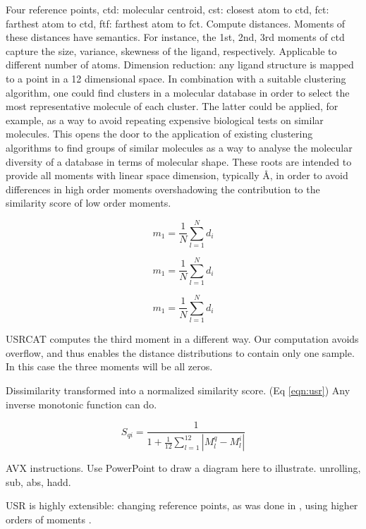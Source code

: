 \documentclass[twocolumn]{svjour3}          %
\begin{document}
Four reference points, ctd: molecular centroid, cst: closest atom to ctd, fct: farthest atom to ctd, ftf: farthest atom to fct. Compute distances. Moments of these distances have semantics. For instance, the 1st, 2nd, 3rd moments of ctd capture the size, variance, skewness of the ligand, respectively. Applicable to different number of atoms. Dimension reduction: any ligand structure is mapped to a point in a 12 dimensional space. In combination with a suitable clustering algorithm, one could find clusters in a molecular database in order to select the most representative molecule of each cluster. The latter could be applied, for example, as a way to avoid repeating expensive biological tests on similar molecules.  This opens the door to the application of existing clustering algorithms to find groups of similar molecules as a way to analyse the molecular diversity of a database in terms of molecular shape. These roots are intended to provide all moments with linear space dimension, typically \AA, in order to avoid differences in high order moments overshadowing the contribution to the similarity score of low order moments.

\begin{equation}
m_1=\frac{1}{N}\sum_{l=1}^{N}d_i
\label{eqn:moment1}
\end{equation}

\begin{equation}
m_1=\frac{1}{N}\sum_{l=1}^{N}d_i
\label{eqn:moment2}
\end{equation}

\begin{equation}
m_1=\frac{1}{N}\sum_{l=1}^{N}d_i
\label{eqn:moment3}
\end{equation}

USRCAT computes the third moment in a different way. Our computation avoids overflow, and thus enables the distance distributions to contain only one sample. In this case the three moments will be all zeros.

Dissimilarity transformed into a normalized similarity score. (Eq \ref{eqn:usr}) Any inverse monotonic function can do.

\begin{equation}
S_{qi}=\frac{1}{1+\frac{1}{12}\sum_{l=1}^{12}|M_l^q-M_l^i|}
\label{eqn:usr}
\end{equation}

AVX instructions. Use PowerPoint to draw a diagram here to illustrate. unrolling, sub, abs, hadd.

USR is highly extensible: changing reference points, as was done in \cite{1334,1335}, using higher orders of moments \cite{1333}.
\end{document}
